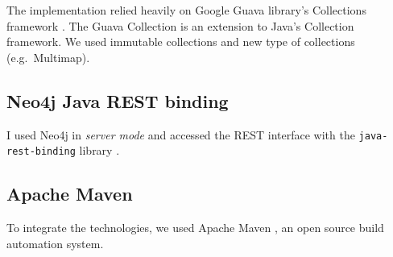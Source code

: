The implementation relied heavily on Google Guava library's Collections framework \cite{guava}. The Guava Collection is an extension to Java's Collection framework. We used immutable collections and new type of collections (e.g.\ Multimap).

\subsection{Neo4j Java REST binding}

I used Neo4j in \textit{server mode} and accessed the REST interface with the \texttt{java-rest-binding} library \cite{restbinding}.

\subsection{Apache Maven}

To integrate the technologies, we used Apache Maven \cite{Maven}, an open source build automation system.
